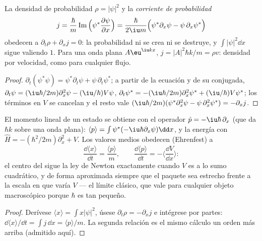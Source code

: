 \begin{proposition}\label{prop:b2:schrodinger-wave-functions:current}
La densidad de probabilidad $\rho = |\psi|^2$ y la \emph{corriente de
probabilidad}
\[
j = \frac{\hbar}{m}\operatorname{Im}\Big(\psi^*\frac{\partial\psi}{\partial x}\Big)
= \frac{\hbar}{2\iu m}\Big(\psi^*\partial_x\psi - \psi\,\partial_x\psi^*\Big)
\]
obedecen a $\partial_t\rho + \partial_xj = 0$: la probabilidad ni se crea ni se
destruye, y $\int|\psi|^2\dd x$ sigue valiendo $1$. Para una onda plana
$A\eu^{\iu kx}$, $j = |A|^2\hbar k/m = \rho v$: densidad por velocidad, como para
cualquier flujo.
\end{proposition}

\begin{proof}
$\partial_t(\psi^*\psi) = \psi^*\partial_t\psi + \psi\,\partial_t\psi^*$; a partir de la
ecuación y de su conjugada, $\partial_t\psi = (\iu\hbar/2m)\partial_x^2\psi -
(\iu/\hbar)V\psi$, $\partial_t\psi^* = -(\iu\hbar/2m)\partial_x^2\psi^* +
(\iu/\hbar)V\psi^*$; los términos en $V$ se cancelan y el resto vale $(\iu\hbar/2m)(\psi^*
\partial_x^2\psi - \psi\,\partial_x^2\psi^*) = -\partial_xj$.
\end{proof}

\begin{proposition}\label{prop:b2:schrodinger-wave-functions:ehrenfest}
El momento lineal de un estado se obtiene con el operador $\hat p =
-\iu\hbar\,\partial_x$ (que da $\hbar k$ sobre una onda plana): $\langle
p\rangle = \int\psi^*(-\iu\hbar\partial_x\psi)\dd x$, y la energía con $\hat H
= -(\hbar^2/2m)\partial_x^2 + V$. Los valores medios obedecen
(Ehrenfest) a
\[
\frac{\dd\langle x\rangle}{\dd t} = \frac{\langle p\rangle}{m}, \qquad
\frac{\dd\langle p\rangle}{\dd t} = -\Big\langle\frac{\dd V}{\dd x}\Big\rangle :
\]
el centro del  sigue la ley de Newton exactamente cuando $V$ es
a lo sumo cuadrático, y de forma aproximada siempre que el paquete sea estrecho
frente a la escala en que varía $V$ --- el límite clásico,
que vale para cualquier objeto macroscópico porque $\hbar$ es tan pequeño.
\end{proposition}

\begin{proof}
Derívese $\langle x\rangle = \int x|\psi|^2$, úsese $\partial_t\rho =
-\partial_xj$ e intégrese por partes: $\dd\langle x\rangle/\dd t = \int j\,\dd x
= \langle p\rangle/m$. La segunda relación es el mismo cálculo un
orden más arriba (admitido aquí).
\end{proof}

